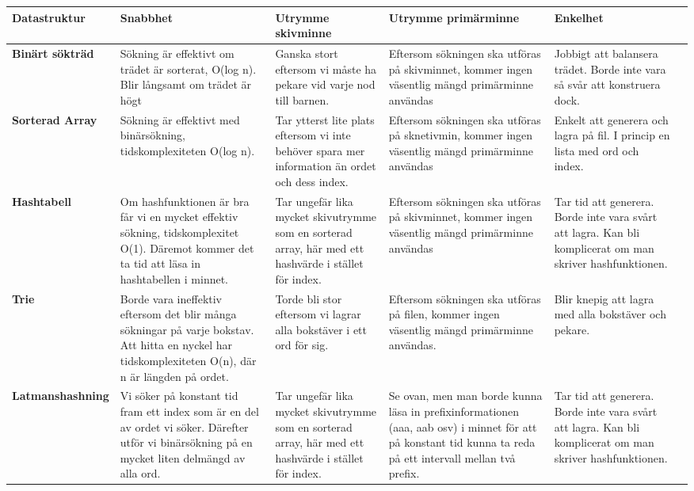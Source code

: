 \documentclass[11pt]{exam}
\begin{document}
\begin{landscape}
	\begin{center}
    \begin{tabular}{|| l | p{4cm} | p{4cm} | p{5cm} | p{4cm} | p{4cm} |}
    \hline
	\centering \textbf{Datastruktur} & \textbf{Snabbhet} & \textbf{Utrymme skivminne} & 	\textbf{Utrymme primärminne} & \textbf{Enkelhet} \\ \hline \hline
    \textbf{Binärt sökträd}
	& Sökning är effektivt om trädet är sorterat, O(log n). Blir långsamt om trädet är högt 
	& Ganska stort eftersom vi måste ha pekare vid varje nod till barnen.
	& Eftersom sökningen ska utföras på skivminnet, kommer ingen väsentlig mängd primärminne användas	
	& Jobbigt att balansera trädet. Borde inte vara så svår att konstruera dock.
	\\ \hline
	\textbf{Sorterad Array}
	& Sökning är effektivt med binärsökning, tidskomplexiteten O(log n).  
	& Tar ytterst lite plats eftersom vi inte behöver spara mer information än ordet och dess index.
	& Eftersom sökningen ska utföras på sknetivmin, kommer ingen väsentlig mängd primärminne användas	
	& Enkelt att generera och lagra på fil. I princip en lista med ord och index.
	\\ \hline
	\textbf{Hashtabell}
	& Om hashfunktionen är bra får vi en mycket effektiv sökning, tidskomplexitet O(1). Däremot kommer det ta tid att läsa in hashtabellen i minnet.
	& Tar ungefär lika mycket skivutrymme som en sorterad array, här med ett hashvärde i stället för index.
	& Eftersom sökningen ska utföras på skivminnet, kommer ingen väsentlig mängd primärminne användas
	& Tar tid att generera. Borde inte vara svårt att lagra. Kan bli komplicerat om man skriver hashfunktionen. 
	\\ \hline
	\textbf{Trie}
	& Borde vara ineffektiv eftersom det blir många sökningar på varje bokstav. Att hitta en nyckel har tidskomplexiteten O(n), där n är längden på ordet.
	& Torde bli stor eftersom vi lagrar alla bokstäver i ett ord för sig.
	& Eftersom sökningen ska utföras på filen, kommer ingen väsentlig mängd primärminne användas.	
	& Blir knepig att lagra med alla bokstäver och pekare.
	\\    \hline
	\textbf{Latmanshashning}
	& Vi söker på konstant tid fram ett index som är en del av ordet vi söker. Därefter utför vi binärsökning på en mycket liten delmängd av alla ord.
	& Tar ungefär lika mycket skivutrymme som en sorterad array, här med ett hashvärde i stället för index.
	& Se ovan, men man borde kunna läsa in prefixinformationen (aaa, aab osv) i minnet för att på konstant tid kunna ta reda på ett intervall mellan två prefix.	
	& Tar tid att generera. Borde inte vara svårt att lagra. Kan bli komplicerat om man skriver hashfunktionen. 
	\\ \hline
    \end{tabular}

\end{center}
\end{landscape}
\end{document}

